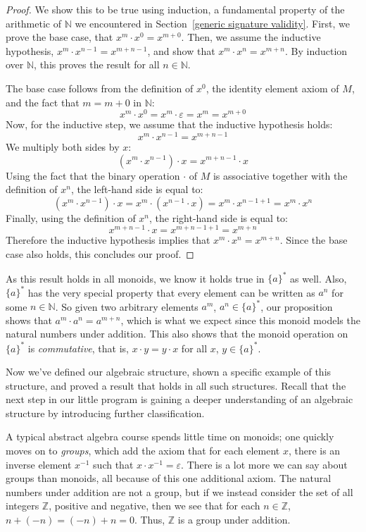 \documentclass[../generics]{subfiles}
\begin{document}
\begin{proof}
We show this to be true using induction, a fundamental property of the arithmetic of $\mathbb{N}$ we encountered in Section~\ref{generic signature validity}. First, we prove the base case, that $x^m\cdot x^0=x^{m+0}$. Then, we assume the inductive hypothesis, $x^m\cdot x^{n-1}=x^{m+n-1}$, and show that $x^m\cdot x^n=x^{m+n}$. By induction over $\mathbb{N}$, this proves the result for all $n\in\mathbb{N}$.

The base case follows from the definition of $x^0$, the identity element axiom of $M$, and the fact that $m=m+0$ in $\mathbb{N}$:
\[x^m\cdot x^0=x^m\cdot\varepsilon=x^m=x^{m+0}\]
Now, for the inductive step, we assume that the inductive hypothesis holds:
\[x^m\cdot x^{n-1}=x^{m+n-1}\]
We multiply both sides by $x$:
\[(x^m\cdot x^{n-1})\cdot x =x^{m+n-1}\cdot x\]
Using the fact that the binary operation $\cdot$ of $M$ is associative together with the definition of $x^n$, the left-hand side is equal to:
\[
(x^m\cdot x^{n-1})\cdot x = x^m\cdot (x^{n-1}\cdot x) = x^m\cdot x^{n-1+1}=x^m\cdot x^n
\]
Finally, using the definition of $x^n$, the right-hand side is equal to:
\[
x^{m+n-1}\cdot x = x^{m+n-1+1}=x^{m+n}
\]
Therefore the inductive hypothesis implies that $x^m\cdot x^n=x^{m+n}$. Since the base case also holds, this concludes our proof.
\end{proof}
As this result holds in all monoids, we know it holds true in $\{a\}^*$ as well. Also, $\{a\}^*$ has the very special property that every element can be written as $a^n$ for some $n\in\mathbb{N}$. So given two arbitrary elements $a^m$, $a^n\in \{a\}^*$, our proposition shows that $a^m\cdot a^n=a^{m+n}$, which is what we expect since this monoid models the natural numbers under addition. This also shows that the monoid operation on $\{a\}^*$ is \emph{commutative}, that is, $x\cdot y=y\cdot x$ for all $x$, $y\in\{a\}^*$.

\medskip
Now we've defined our algebraic structure, shown a specific example of this structure, and proved a result that holds in all such structures. Recall that the next step in our little program is gaining a deeper understanding of an algebraic structure by introducing further classification.

A typical abstract algebra course spends little time on monoids; one quickly moves on to \emph{groups}, which add the axiom that for each element $x$, there is an inverse element $x^{-1}$ such that $x\cdot x^{-1}=\varepsilon$. There is a lot more we can say about groups than monoids, all because of this one additional axiom. The natural numbers under addition are not a group, but if we instead consider the set of all integers $\mathbb{Z}$, positive and negative, then we see that for each $n\in\mathbb{Z}$, $n+(-n)=(-n)+n=0$. Thus, $\mathbb{Z}$ is a group under addition.
\end{document}
